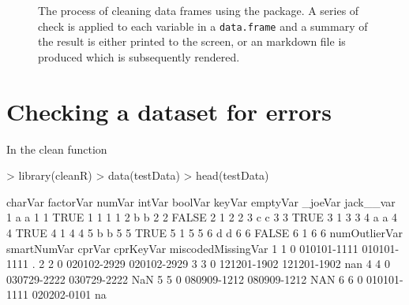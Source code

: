 \documentclass[article]{jss}
\begin{document}


\begin{figure}
\begin{center}
\end{center}
\label{fig:flowchart1}
\caption{The process of cleaning data frames using the 
  package. A series of check is applied to each variable in a
  \texttt{data.frame} and a summary of the result is either printed to
  the screen, or an  markdown file is produced which is
  subsequently rendered.}
\end{figure}

\section{Checking a dataset for errors} \label{sec:example1}

In  the clean function

\begin{Schunk}
\begin{Sinput}
> library(cleanR)
> data(testData)
> head(testData)
\end{Sinput}
\begin{Soutput}
  charVar factorVar numVar intVar boolVar keyVar emptyVar _joeVar jack__var
1       a         a      1      1    TRUE      1        1       1         1
2       b         b      2      2   FALSE      2        1       2         2
3       c         c      3      3    TRUE      3        1       3         3
4       a         a      4      4    TRUE      4        1       4         4
5       b         b      5      5    TRUE      5        1       5         5
6       d         d      6      6   FALSE      6        1       6         6
  numOutlierVar smartNumVar      cprVar   cprKeyVar miscodedMissingVar
1             1           0 010101-1111 010101-1111                  .
2             2           0 020102-2929 020102-2929                   
3             3           0 121201-1902 121201-1902                nan
4             4           0 030729-2222 030729-2222                NaN
5             5           0 080909-1212 080909-1212                NAN
6             6           0 010101-1111 020202-0101                 na
\end{Soutput}
\end{Schunk}
\end{document}

